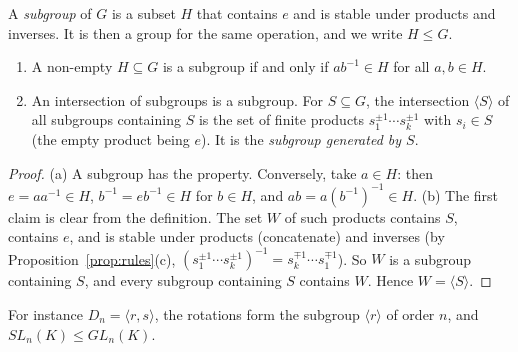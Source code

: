 \begin{definition}
A \emph{subgroup} of $G$ is a subset $H$ that contains $e$ and is stable under products and inverses. It is then a group for the same operation, and we write $H\le G$.
\end{definition}

\begin{proposition}\label{prop:subgroup}
\begin{enumerate}[label=(\alph*)]
\item A non-empty $H\subseteq G$ is a subgroup if and only if $ab^{-1}\in H$ for all $a,b\in H$.
\item An intersection of subgroups is a subgroup. For $S\subseteq G$, the intersection $\langle S\rangle$ of all subgroups containing $S$ is the set of finite products $s_1^{\pm1}\cdots s_k^{\pm1}$ with $s_i\in S$ (the empty product being $e$). It is the \emph{subgroup generated by $S$}.
\end{enumerate}
\end{proposition}
\begin{proof}
(a) A subgroup has the property. Conversely, take $a\in H$: then $e=aa^{-1}\in H$, $b^{-1}=eb^{-1}\in H$ for $b\in H$, and $ab=a(b^{-1})^{-1}\in H$.
(b) The first claim is clear from the definition. The set $W$ of such products contains $S$, contains $e$, and is stable under products (concatenate) and inverses (by Proposition~\ref{prop:rules}(c), $(s_1^{\pm1}\cdots s_k^{\pm1})^{-1}=s_k^{\mp1}\cdots s_1^{\mp1}$). So $W$ is a subgroup containing $S$, and every subgroup containing $S$ contains $W$. Hence $W=\langle S\rangle$.
\end{proof}

For instance $D_n=\langle r,s\rangle$, the rotations form the subgroup $\langle r\rangle$ of order $n$, and $SL_n(K)\le GL_n(K)$.

